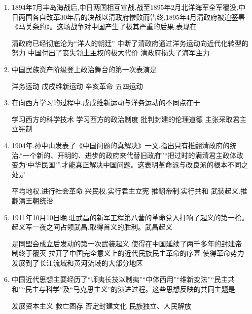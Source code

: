 \documentclass[12pt, a4paper, oneside, UTF8]{ctexbook}
\begin{document}
\begin{enumerate}
    \item \bl 1894年7月丰岛海战后,中日两国相互宣战,战至1895年2月北洋海军全军覆没,中日两国各自改革30年后的决战以清政府惨败而告终,1895年4月清政府被迫签署《马关条约》。这场战争对中国产生了极其严重的后果,表现在
    \begin{choices}[1]
    \task 清政府已经彻底沦为“洋人的朝廷”
    \task 中断了清政府通过洋务运动向近代化转型的努力
    \task 中国付出了丧失领土主权的极大代价
    \task 清政府损失了海军主力
    \end{choices}

    \item 中国民族资产阶级登上政治舞台的第一次表演是
    \begin{choices}
    \task 洋务运动
    \task 戊戌维新运动
    \task 辛亥革命
    \task 五四运动
    \end{choices}

    \item \bl 在向西方学习的过程中.戊戌维新运动与洋务运动的不同点在于
    \begin{choices}[2]
    \task 学习西方的科学技术
    \task 学习西方的政治制度
    \task 批判封建的伦理道德
    \task 主张采取君主立宪制
    \end{choices}

    \item 1904年.孙中山发表了《中国问题的真解决》一文.指出只有推翻清政府的统治.“一个新的、开明的、进步的政府来代替旧政府”“把过时的满清君主政体改变为‘中华民国’”.才能真正解决中国问题。这表明革命派与改良派的根本不同之处是
    \begin{choices}[2]
    \task 平均地权.进行社会革命
    \task 兴民权.实行君主立宪
    \task 推翻帝制.实行共和
    \task 武装起义.推翻清王朝统治
    \end{choices}

    \item 1911年10月10日晚.驻武昌的新军工程第八营的革命党人打响了起义的第一枪。起义军一夜之间占领武昌.取得首义的胜利。武昌起义
    \begin{choices}[1]
    \task 是同盟会成立后发动的第一次武装起义
    \task 使得在中国延续了两千多年的封建帝制终于覆灭
    \task 拉开了中国完全意义上的近代民族民主革命的序幕
    \task 使得革命势力发展到了长江流域和黄河流域的大部分地区
    \end{choices}

    \item 中国近代思想主要经历了“师夷长技以制夷”“中体西用”“维新变法”“民主共和”“民主与科学”及“马克思主义”的演进过程。这些思想反映的共同主题是
    \begin{choices}[2]
    \task 发展资本主义
    \task 救亡图存
    \task 否定封建文化
    \task 民族独立、人民解放
    \end{choices}
    

\end{enumerate}
\end{document}
